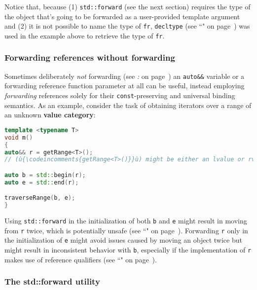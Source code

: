 \noindent Notice that, because (1) \texttt{std::forward} (see the next section) requires the
type of the object that's going to be forwarded as a user-provided
template argument and (2) it is not possible to name the type of
\texttt{fr}, \texttt{decltype} (see ``" on page~\pageref{decltype}) was used in the example above
to retrieve the type of \texttt{fr}.

\subsubsection[Forwarding references without forwarding]{Forwarding references without forwarding}\label{forwarding-references-without-forwarding}

Sometimes deliberately \emph{not} forwarding (see \textit{: } on page~\pageref{the-std::forward-utility}) an \texttt{auto\&\&} variable or
a forwarding reference function parameter at all can be useful, instead employing
\emph{forwarding} references solely for their \texttt{const}-preserving
and universal binding semantics. As an example, consider the task of
obtaining iterators over a range of an unknown \textbf{value category}:

\begin{lstlisting}[language=C++]
template <typename T>
void m()
{
auto&& r = getRange<T>();
// (ù{\codeincomments{getRange<T>()}}ù) might be either an lvalue or rvalue depending on (ù{\codeincomments{T}}ù).

auto b = std::begin(r);
auto e = std::end(r);

traverseRange(b, e);
}
\end{lstlisting}

\noindent Using \texttt{std::forward} in the initialization of both \texttt{b} and
\texttt{e} might result in moving from \texttt{r} twice, which is
potentially unsafe (see ``" on page~\pageref{Rvalue-References}). Forwarding
\texttt{r} only in the initialization of \texttt{e} might avoid issues
caused by moving an object twice but might result in inconsistent
behavior with \texttt{b}, especially if the implementation of \texttt{r}
makes use of reference qualifiers (see ``" on page~\pageref{refqualifiers}).

\subsubsection[The {\tt std::forward} utility]{The {\SubsubsecCode std::forward} utility}\label{the-std::forward-utility}


